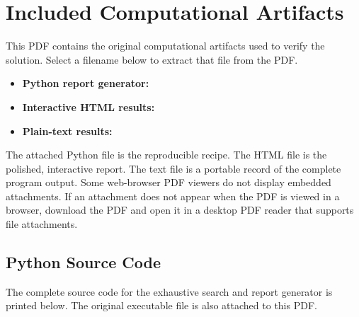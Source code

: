 \documentclass[11pt]{article}
\begin{document}
\section*{Included Computational Artifacts} This PDF contains the original computational artifacts used to verify the solution. Select a filename below to extract that file from the PDF. \begin{itemize} \item \textbf{Python report generator:}  \item \textbf{Interactive HTML results:}  \item \textbf{Plain-text results:}  \end{itemize} The attached Python file is the reproducible recipe. The HTML file is the polished, interactive report. The text file is a portable record of the complete program output. Some web-browser PDF viewers do not display embedded attachments. If an attachment does not appear when the PDF is viewed in a browser, download the PDF and open it in a desktop PDF reader that supports file attachments.

\subsection*{Python Source Code} The complete source code for the exhaustive search and report generator is printed below. The original executable file is also attached to this PDF. 
\end{document}
